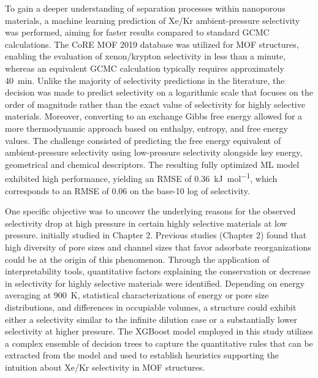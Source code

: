 \documentclass[main]{subfiles}
\begin{document}
To gain a deeper understanding of separation processes within nanoporous materials, a machine learning prediction of Xe/Kr ambient-pressure selectivity was performed, aiming for faster results compared to standard GCMC calculations. The CoRE MOF 2019 database was utilized for MOF structures, enabling the evaluation of xenon/krypton selectivity in less than a minute, whereas an equivalent GCMC calculation typically requires approximately \SI{40}{\minute}. 
Unlike the majority of selectivity predictions in the literature, the decision was made to predict selectivity on a logarithmic scale that focuses on the order of magnitude rather than the exact value of selectivity for highly selective materials. Moreover, converting to an exchange Gibbs free energy allowed for a more thermodynamic approach based on enthalpy, entropy, and free energy values. The challenge consisted of predicting the free energy equivalent of ambient-pressure selectivity using low-pressure selectivity alongside key energy, geometrical and chemical descriptors. The resulting fully optimized ML model exhibited high performance, yielding an RMSE of \SI{0.36}{\kilo\joule\per\mole}, which corresponds to an RMSE of $0.06$ on the base-10 log of selectivity.

One specific objective was to uncover the underlying reasons for the observed selectivity drop at high pressure in certain highly selective materials at low pressure. initially studied in Chapter 2. Previous studies (Chapter 2) found that high diversity of pore sizes and channel sizes that favor adsorbate reorganizations could be at the origin of this phenomenon. Through the application of interpretability tools, quantitative factors explaining the conservation or decrease in selectivity for highly selective materials were identified. Depending on energy averaging at \SI{900}{\kelvin}, statistical characterizations of energy or pore size distributions, and differences in occupiable volumes, a structure could exhibit either a selectivity similar to the infinite dilution case or a substantially lower selectivity at higher pressure. The XGBoost model employed in this study utilizes a complex ensemble of decision trees to capture the quantitative rules that can be extracted from the model and used to establish heuristics supporting the intuition about Xe/Kr selectivity in MOF structures.
\end{document}
